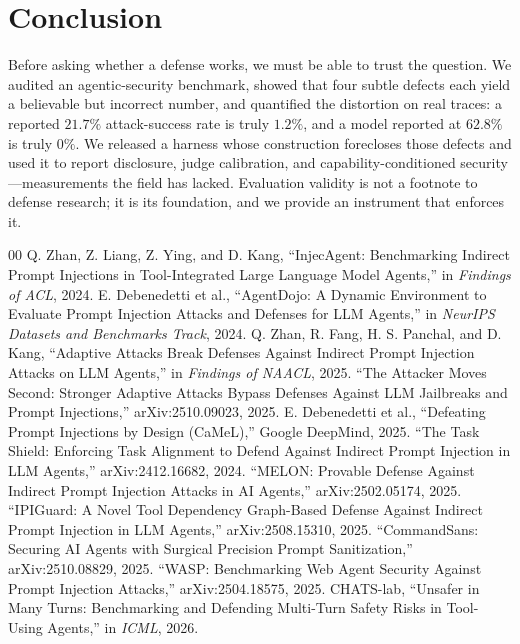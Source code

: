 \documentclass[conference]{IEEEtran}
\begin{document}
\section{Conclusion}
\label{sec:conclusion}

Before asking whether a defense works, we must be able to trust the question. We
audited an agentic-security benchmark, showed that four subtle defects each yield a
believable but incorrect number, and quantified the distortion on real traces: a
reported $21.7\%$ attack-success rate is truly $1.2\%$, and a model reported at
$62.8\%$ is truly $0\%$. We released a harness whose construction forecloses those
defects and used it to report disclosure, judge calibration, and
capability-conditioned security---measurements the field has lacked. Evaluation
validity is not a footnote to defense research; it is its foundation, and we provide
an instrument that enforces it.

\begin{thebibliography}{00}
 Q. Zhan, Z. Liang, Z. Ying, and D. Kang, ``InjecAgent:
Benchmarking Indirect Prompt Injections in Tool-Integrated Large Language Model
Agents,'' in \emph{Findings of ACL}, 2024.
 E. Debenedetti et al., ``AgentDojo: A Dynamic Environment to
Evaluate Prompt Injection Attacks and Defenses for LLM Agents,'' in \emph{NeurIPS
Datasets and Benchmarks Track}, 2024.
 Q. Zhan, R. Fang, H. S. Panchal, and D. Kang, ``Adaptive Attacks
Break Defenses Against Indirect Prompt Injection Attacks on LLM Agents,'' in
\emph{Findings of NAACL}, 2025.
 ``The Attacker Moves Second: Stronger Adaptive Attacks
Bypass Defenses Against LLM Jailbreaks and Prompt Injections,'' arXiv:2510.09023,
2025.
 E. Debenedetti et al., ``Defeating Prompt Injections by Design
(CaMeL),'' Google DeepMind, 2025.
 ``The Task Shield: Enforcing Task Alignment to Defend Against
Indirect Prompt Injection in LLM Agents,'' arXiv:2412.16682, 2024.
 ``MELON: Provable Defense Against Indirect Prompt Injection Attacks in
AI Agents,'' arXiv:2502.05174, 2025.
 ``IPIGuard: A Novel Tool Dependency Graph-Based Defense Against
Indirect Prompt Injection in LLM Agents,'' arXiv:2508.15310, 2025.
 ``CommandSans: Securing AI Agents with Surgical Precision Prompt
Sanitization,'' arXiv:2510.08829, 2025.
 ``WASP: Benchmarking Web Agent Security Against Prompt Injection
Attacks,'' arXiv:2504.18575, 2025.
 CHATS-lab, ``Unsafer in Many Turns: Benchmarking and Defending
Multi-Turn Safety Risks in Tool-Using Agents,'' in \emph{ICML}, 2026.
\end{thebibliography}
\end{document}
